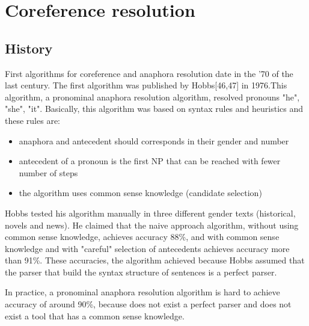 \chapter{Coreference resolution}
\label{chapter:Coreference resolution}
\section{History}

First algorithms for coreference and anaphora resolution date in the '70 of the last century. The first algorithm was published by Hobbs[46,47] in 1976.This algorithm, a pronominal anaphora resolution algorithm, resolved pronouns "he", "she",  "it". Basically, this algorithm was based on syntax rules and heuristics and these rules are:

\begin{itemize}
	\item anaphora and antecedent should corresponds in their gender and number
	\item antecedent of a pronoun is the first NP that can be reached with fewer number of steps
	\item the algorithm uses common sense knowledge (candidate selection)
\end{itemize}

Hobbs tested his algorithm manually in three different gender texts (historical, novels and news). He claimed that the naive approach algorithm, without using common sense knowledge, achieves accuracy 88\%, and with common sense knowledge  and with "careful" selection of antecedents achieves accuracy more than 91\%. These accuracies, the algorithm achieved because Hobbs assumed that the parser that build the syntax structure of sentences is a perfect parser.   

In practice, a pronominal anaphora resolution algorithm is hard to achieve accuracy of around 90\%, because does not exist a perfect parser and does not exist a tool that has a common sense knowledge.

